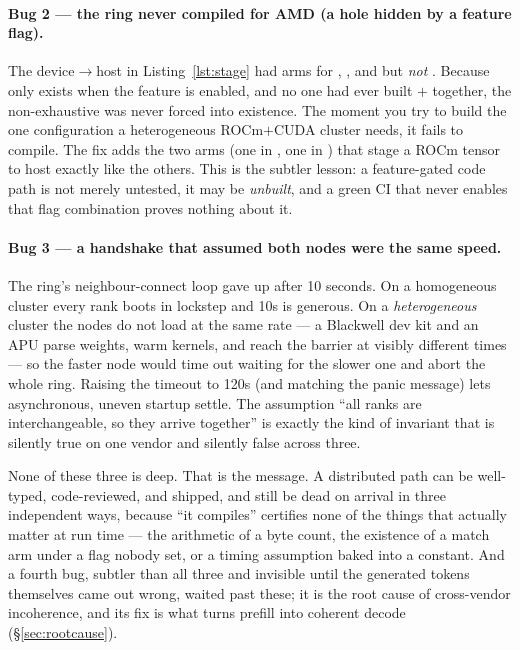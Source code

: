 \documentclass[11pt]{article}
\begin{document}
\paragraph{Bug 2 --- the ring never compiled for AMD (a hole hidden by a feature flag).}
The device$\to$host  in Listing~\ref{lst:stage} had arms for , , and
 but \emph{not} . Because  only exists when the 
feature is enabled, and no one had ever built  $+$  together, the non-exhaustive
 was never forced into existence. The moment you try to build the one configuration a
heterogeneous ROCm$+$CUDA cluster needs, it fails to compile. The fix adds the two
\code{\#[cfg(feature = "rocm")]} arms (one in , one in ) that
stage a ROCm tensor to host exactly like the others. This is the subtler lesson: a feature-gated code
path is not merely untested, it may be \emph{unbuilt}, and a green CI that never enables that flag
combination proves nothing about it.

\paragraph{Bug 3 --- a handshake that assumed both nodes were the same speed.}
The ring's neighbour-connect loop gave up after 10 seconds. On a homogeneous cluster every rank boots in
lockstep and 10s is generous. On a \emph{heterogeneous} cluster the nodes do not load at the same rate ---
a Blackwell dev kit and an APU parse weights, warm kernels, and reach the barrier at visibly different
times --- so the faster node would time out waiting for the slower one and abort the whole ring. Raising
the timeout to 120s (and matching the panic message) lets asynchronous, uneven startup settle. The
assumption ``all ranks are interchangeable, so they arrive together'' is exactly the kind of invariant
that is silently true on one vendor and silently false across three.

None of these three is deep. That is the message. A distributed path can be well-typed, code-reviewed,
and shipped, and still be dead on arrival in three independent ways, because ``it compiles'' certifies
none of the things that actually matter at run time --- the arithmetic of a byte count, the existence of a
match arm under a flag nobody set, or a timing assumption baked into a constant. And a fourth bug, subtler
than all three and invisible until the generated tokens themselves came out wrong, waited past these; it
is the root cause of cross-vendor incoherence, and its fix is what turns prefill into coherent decode
(\S\ref{sec:rootcause}).
\end{document}
